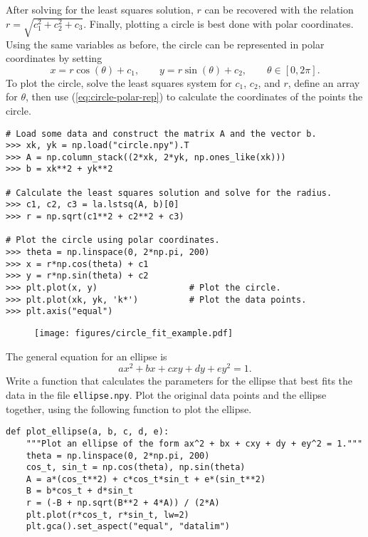 After solving for the least squares solution, $r$ can be recovered with the relation $r = \sqrt{c_1^2 + c_2^2 + c_3}$.
Finally, plotting a circle is best done with polar coordinates.
Using the same variables as before, the circle can be represented in polar coordinates by setting
\begin{equation}
x = r\cos(\theta) + c_1, \qquad
y = r\sin(\theta) + c_2, \qquad
\theta\in [0,2\pi].
\label{eq:circle-polar-rep}
\end{equation}
To plot the circle, solve the least squares system for $c_1$, $c_2$, and $r$, define an array for $\theta$, then use (\ref{eq:circle-polar-rep}) to calculate the coordinates of the points the circle.

\begin{lstlisting}
# Load some data and construct the matrix A and the vector b.
>>> xk, yk = np.load("circle.npy").T
>>> A = np.column_stack((2*xk, 2*yk, np.ones_like(xk)))
>>> b = xk**2 + yk**2

# Calculate the least squares solution and solve for the radius.
>>> c1, c2, c3 = la.lstsq(A, b)[0]
>>> r = np.sqrt(c1**2 + c2**2 + c3)

# Plot the circle using polar coordinates.
>>> theta = np.linspace(0, 2*np.pi, 200)
>>> x = r*np.cos(theta) + c1
>>> y = r*np.sin(theta) + c2
>>> plt.plot(x, y)                  # Plot the circle.
>>> plt.plot(xk, yk, 'k*')          # Plot the data points.
>>> plt.axis("equal")
\end{lstlisting}

\begin{figure}[H]
    \texttt{[image: figures/circle\_fit\_example.pdf]}
\end{figure}

\begin{problem}
\label{prob:lstsq-ellipse-fit}
The general equation for an ellipse is \[ax^2 + bx + cxy + dy + ey^2 = 1.\]
Write a function that calculates the parameters for the ellipse that best fits the data in the file \texttt{ellipse.npy}.
Plot the original data points and the ellipse together, using the following function to plot the ellipse.

\begin{lstlisting}
def plot_ellipse(a, b, c, d, e):
    """Plot an ellipse of the form ax^2 + bx + cxy + dy + ey^2 = 1."""
    theta = np.linspace(0, 2*np.pi, 200)
    cos_t, sin_t = np.cos(theta), np.sin(theta)
    A = a*(cos_t**2) + c*cos_t*sin_t + e*(sin_t**2)
    B = b*cos_t + d*sin_t
    r = (-B + np.sqrt(B**2 + 4*A)) / (2*A)
    plt.plot(r*cos_t, r*sin_t, lw=2)
    plt.gca().set_aspect("equal", "datalim")
\end{lstlisting}
\end{problem}

